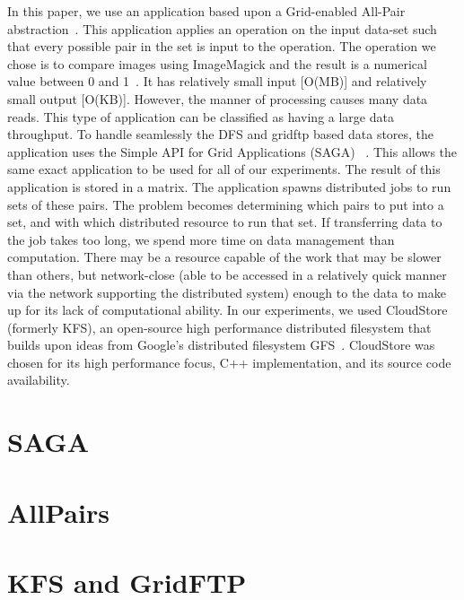 \documentclass[a4paper,11pt]{article} \pagestyle{empty} \usepackage{amssymb}
\newcommand{\micnote}[1]{ {\textcolor{blue} { ***Michael: #1 }}} \else
\newcommand{\jhanote}[1]{} \newcommand{\micnote}[1]{} \newcommand{\fixme}[1]{}
\begin{document}

In this paper, we use an application based upon a Grid-enabled All-Pair
abstraction~\cite{Interop, AllPairs}. This application applies an operation on
the input data-set such that every possible pair in the set is input to the
operation. The operation we chose is to compare images using ImageMagick and
the result is a numerical value between 0 and 1~\cite{imagemagick}. It has
relatively small input [O(MB)] and relatively small output [O(KB)]. However,
the manner of processing causes many data reads. This type of application can
be classified as having a large data throughput. To handle seamlessly the DFS
and gridftp based data stores, the application uses the Simple API for Grid
Applications (SAGA) ~\cite{saga_web}. This allows the same exact application to
be used for all of our experiments. The result of this application is stored in
a matrix. The application spawns distributed jobs to run sets of these pairs.
The problem becomes determining which pairs to put into a set, and with which
distributed resource to run that set. If transferring data to the job takes too
long, we spend more time on data management than computation. There may be a
resource capable of the work that may be slower than others, but network-close
(able to be accessed in a relatively quick manner via the network supporting
the distributed system) enough to the data to make up for its lack of
computational ability. In our experiments, we used CloudStore (formerly KFS),
an open-source high performance distributed filesystem that builds upon ideas
from Google's distributed filesystem GFS~\cite{kfs_web}.  CloudStore was chosen
for its high performance focus, C++ implementation, and its source code
   availability.

\section{SAGA} \section{AllPairs} \section{KFS and GridFTP}
\end{document}
